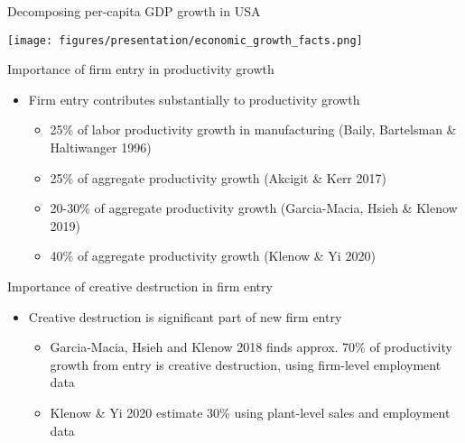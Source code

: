 \documentclass[english,usenames,dvipsnames]{beamer}
\begin{document}
\begin{frame}{Decomposing per-capita GDP growth in USA}\label{economic_growth_facts}\hyperlink{motivation_spillovers}{}
	\begin{table}
		\texttt{[image: figures/presentation/economic\_growth\_facts.png]}
		\caption{Growth accounting (from Jones 2016, "The Facts of Economic Growth")}
	\end{table}
\end{frame}

\begin{frame}{Importance of firm entry in productivity growth}\label{motivation:importance_of_firm_entry}
	\hyperlink{motivation_spillovers}{}
	\begin{itemize}
		\item Firm entry contributes substantially to productivity growth
		\begin{itemize}
			\item 25\% of labor productivity growth in manufacturing (Baily, Bartelsman \& Haltiwanger 1996)
			\item 25\% of aggregate productivity growth (Akcigit \& Kerr 2017)
			\item 20-30\% of aggregate productivity growth (Garcia-Macia, Hsieh \& Klenow 2019)
			\item 40\% of aggregate productivity growth (Klenow \& Yi 2020)
		\end{itemize}
	\end{itemize}
\end{frame}

\begin{frame}{Importance of creative destruction in firm entry}\label{motivation:importance_of_creative_destruction}
	\hyperlink{motivation_spillovers}{}
	\begin{itemize}
		\item Creative destruction is significant part of new firm entry
		\begin{itemize}
			\item Garcia-Macia, Hsieh and Klenow 2018 finds approx. 70\% of productivity growth from entry is creative destruction, using firm-level employment data
			\item Klenow \& Yi 2020 estimate 30\% using plant-level sales and employment data
		\end{itemize}
	\end{itemize}
\end{frame}
\end{document}
